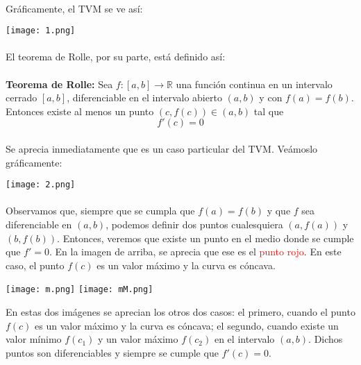 \documentclass[letter]{article}
\begin{document}
\paragraph{}Gráficamente, el TVM se ve así:
\begin{center}
    \texttt{[image: 1.png]}
\end{center}
\paragraph{}El teorema de Rolle, por su parte, está definido así:
\paragraph{}\textbf{Teorema de Rolle: }Sea $f:[a,b]\longrightarrow\mathbb{R}$ una función continua en un intervalo cerrado $[a,b]$, diferenciable en el intervalo abierto $(a,b)$ y con $f(a)=f(b)$. Entonces existe al menos un punto $(c,f(c))\in(a,b)$ tal que $$f'(c)=0$$
\paragraph{}Se aprecia inmediatamente que es un caso particular del TVM. Veámoslo gráficamente:
\begin{center}
    \texttt{[image: 2.png]}
\end{center}
\paragraph{}Observamos que, siempre que se cumpla que $f(a)=f(b)$ y que $f$ sea diferenciable en $(a,b)$, podemos definir dos puntos cualesquiera $(a,f(a))$ y $(b,f(b))$. Entonces, veremos que existe un punto en el medio donde se cumple que $f'=0$. En la imagen de arriba, se aprecia que ese es el \textcolor{red}{punto rojo}. En este caso, el punto $f(c)$ es un valor máximo y la curva es cóncava.
\begin{center}
    \texttt{[image: m.png]}
    \texttt{[image: mM.png]}
\end{center}
En estas dos imágenes se aprecian los otros dos casos: el primero, cuando el punto $f(c)$ es un valor máximo y la curva es cóncava; el segundo, cuando existe un valor mínimo $f(c_1)$ y un valor máximo $f(c_2)$ en el intervalo $(a,b)$. Dichos puntos son diferenciables y siempre se cumple que $f'(c)=0$.

\end{document}
